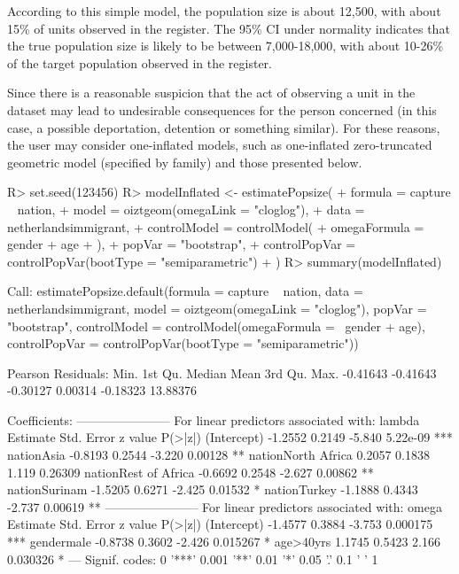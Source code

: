 \documentclass[
]{jss}
\newcommand{\1}{\mathcal{I}} \newcommand{\bZero}{\boldsymbol{0}}
\begin{document}
According to this simple model, the population size is about 12,500,
with about 15\% of units observed in the register. The 95\% CI under
normality indicates that the true population size is likely to be
between 7,000-18,000, with about 10-26\% of the target population
observed in the register.

Since there is a reasonable suspicion that the act of observing a unit
in the dataset may lead to undesirable consequences for the person
concerned (in this case, a possible deportation, detention or something
similar). For these reasons, the user may consider one-inflated models,
such as one-inflated zero-truncated geometric model (specified by
 family) and those presented below.

\begin{CodeChunk}
\begin{CodeInput}
R> set.seed(123456)
R> modelInflated <- estimatePopsize(
+     formula = capture ~ nation,
+     model   = oiztgeom(omegaLink = "cloglog"),
+     data    = netherlandsimmigrant,
+     controlModel = controlModel(
+         omegaFormula = ~ gender + age
+     ),
+     popVar = "bootstrap",
+     controlPopVar = controlPopVar(bootType = "semiparametric")
+ )
R> summary(modelInflated)
\end{CodeInput}
\begin{CodeOutput}

Call:
estimatePopsize.default(formula = capture ~ nation, data = netherlandsimmigrant, 
    model = oiztgeom(omegaLink = "cloglog"), popVar = "bootstrap", 
    controlModel = controlModel(omegaFormula = ~gender + age), 
    controlPopVar = controlPopVar(bootType = "semiparametric"))

Pearson Residuals:
    Min.  1st Qu.   Median     Mean  3rd Qu.     Max. 
-0.41643 -0.41643 -0.30127  0.00314 -0.18323 13.88376 

Coefficients:
-----------------------
For linear predictors associated with: lambda 
                     Estimate Std. Error z value  P(>|z|)    
(Intercept)           -1.2552     0.2149  -5.840 5.22e-09 ***
nationAsia            -0.8193     0.2544  -3.220  0.00128 ** 
nationNorth Africa     0.2057     0.1838   1.119  0.26309    
nationRest of Africa  -0.6692     0.2548  -2.627  0.00862 ** 
nationSurinam         -1.5205     0.6271  -2.425  0.01532 *  
nationTurkey          -1.1888     0.4343  -2.737  0.00619 ** 
-----------------------
For linear predictors associated with: omega 
            Estimate Std. Error z value  P(>|z|)    
(Intercept)  -1.4577     0.3884  -3.753 0.000175 ***
gendermale   -0.8738     0.3602  -2.426 0.015267 *  
age>40yrs     1.1745     0.5423   2.166 0.030326 *  
---
Signif. codes:  0 '***' 0.001 '**' 0.01 '*' 0.05 '.' 0.1 ' ' 1


\end{CodeOutput}
\end{CodeChunk}
\end{document}
